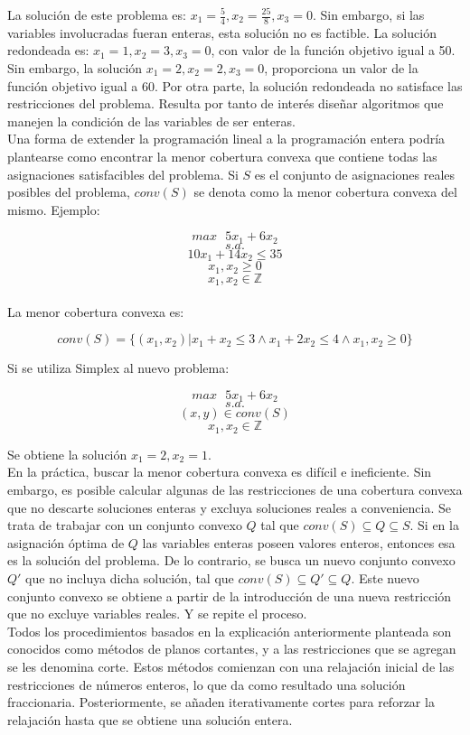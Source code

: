 \documentclass[12pt]{report}
\begin{document}
La solución de este problema es: $x_1 = \frac54,x_2 = \frac{25}{8},x_3 = 0$. Sin embargo, si las variables involucradas fueran enteras, esta solución no es factible. La solución redondeada es: $x_1 = 1,x_2 = 3,x_3 = 0$, con valor de la función objetivo igual a 50. Sin embargo, la solución $x_1 = 2,x_2 = 2,x_3 = 0$, proporciona un valor de la función objetivo igual a 60. Por otra parte, la solución redondeada no satisface las restricciones del problema. Resulta por tanto de interés diseñar algoritmos que manejen la condición de las variables de ser enteras.\\

Una forma de extender la programación lineal a la programación entera podría plantearse como encontrar la menor cobertura convexa que contiene todas las asignaciones satisfacibles del problema. Si $S$ es el conjunto de asignaciones reales posibles del problema, $conv(S)$ se denota como la menor cobertura convexa del mismo. Ejemplo:

$$max \text{ } 5x_1+6x_2$$
$$s.a.$$
$$10x_1+14x_2 \leq  35$$
$$x_1,x_2\geq 0$$
$$x_1,x_2\in\mathbb{Z}$$\\

La menor cobertura convexa es:

$$conv(S)=\{(x_1,x_2)|x_1+x_2\leq 3 \land x_1+2x_2\leq 4 \land x_1,x_2\geq 0\}$$

Si se utiliza Simplex al nuevo problema:

$$max \text{ } 5x_1+6x_2$$
$$s.a.$$
$$(x,y) \in conv(S)$$
$$x_1,x_2\in\mathbb{Z}$$

Se obtiene la solución $x_1=2, x_2=1$.\\

En la práctica, buscar la menor cobertura convexa es difícil e ineficiente. Sin embargo, es posible calcular algunas de las restricciones de una cobertura convexa que no descarte soluciones enteras y excluya soluciones reales a conveniencia. Se trata de trabajar con un conjunto convexo $Q$ tal que $conv(S)\subseteq Q\subseteq S$. Si en la asignación óptima de $Q$ las variables enteras poseen valores enteros, entonces esa es la solución del problema. De lo contrario, se busca un nuevo conjunto convexo $Q'$ que no incluya dicha solución, tal que $conv(S)\subseteq Q'\subseteq Q$. Este nuevo conjunto convexo se obtiene a partir de la introducción de una nueva restricción que no excluye variables reales. Y se repite el proceso.\\

Todos los procedimientos basados en la explicación anteriormente planteada son conocidos como métodos de planos cortantes, y a las restricciones que se agregan se les denomina corte. Estos métodos comienzan con una relajación inicial de las restricciones de números enteros, lo que da como resultado una solución fraccionaria. Posteriormente, se añaden iterativamente cortes para reforzar la relajación hasta que se obtiene una solución entera.\\
\end{document}
